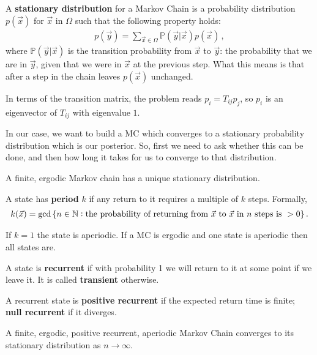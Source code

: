 \documentclass[main.tex]{subfiles}
\begin{document}

A \textbf{stationary distribution} for a Markov Chain is a probability distribution \(p(\vec{x})\) for \(\vec{x}\) in \(\Omega \) such that the following property holds: 
%
\begin{align}
p(\vec{y}) = \sum _{\vec{x} \in \Omega} \mathbb{P}(\vec{y} | \vec{x}) p(\vec{x})
\,,
\end{align}
%
where \(\mathbb{P}(\vec{y} | \vec{x})\) is the transition probability from \(\vec{x}\) to \(\vec{y}\): the probability that we are in \(\vec{y}\), given that we were in \(\vec{x}\) at the previous step. 
What this means is that after a step in the chain leaves \(p(\vec{x})\) unchanged. 

In terms of the transition matrix, the problem reads \(p_i = T_{ij} p_j\), so \(p_i\) is an eigenvector of \(T_{ij}\) with eigenvalue \(1\). 

In our case, we want to build a MC which converges to a stationary probability distribution which is our posterior. 
So, first we need to ask whether this can be done, and then how long it takes for us to converge to that distribution. 

\begin{theorem}
    A finite, ergodic Markov chain has a unique stationary distribution. 
\end{theorem}

A state has \textbf{period} \(k\) if any return to it requires a multiple of \(k\) steps. Formally, 
%
\begin{align}
k(\vec{x}) =  \gcd \qty{ n \in \mathbb{N}: \text{the probability of returning from \(\vec{x}\) to \(\vec{x}\) in \(n\) steps is } >0}
\,.
\end{align}
%

If \(k=1\) the state is aperiodic. 
If a MC is ergodic and one state is aperiodic then all states are.  

A state is \textbf{recurrent} if with probability 1 we will return to it at some point if we leave it.
It is called \textbf{transient} otherwise.

A recurrent state is \textbf{positive recurrent} if the expected return time is finite; \textbf{null recurrent} if it diverges. 

\begin{theorem}
    A finite, ergodic, positive recurrent, aperiodic Markov Chain converges to its stationary distribution as \(n \to \infty \). 
\end{theorem}
\end{document}
